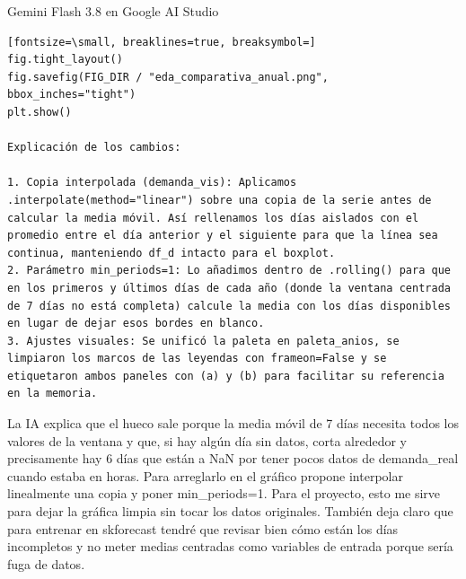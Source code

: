\documentclass[12pt,a4paper,oneside]{book}
\begin{document}
\begin{iaresp}{Gemini Flash 3.8 en Google AI Studio}
\begin{Verbatim}[fontsize=\small, breaklines=true, breaksymbol=]
fig.tight_layout()
fig.savefig(FIG_DIR / "eda_comparativa_anual.png", bbox_inches="tight")
plt.show()

Explicación de los cambios:

1. Copia interpolada (demanda_vis): Aplicamos .interpolate(method="linear") sobre una copia de la serie antes de calcular la media móvil. Así rellenamos los días aislados con el promedio entre el día anterior y el siguiente para que la línea sea continua, manteniendo df_d intacto para el boxplot.
2. Parámetro min_periods=1: Lo añadimos dentro de .rolling() para que en los primeros y últimos días de cada año (donde la ventana centrada de 7 días no está completa) calcule la media con los días disponibles en lugar de dejar esos bordes en blanco.
3. Ajustes visuales: Se unificó la paleta en paleta_anios, se limpiaron los marcos de las leyendas con frameon=False y se etiquetaron ambos paneles con (a) y (b) para facilitar su referencia en la memoria.
\end{Verbatim}
\end{iaresp}
\begin{iaanalisis}
La IA explica que el hueco sale porque la media móvil de 7 días necesita todos los valores de la ventana y que, si hay algún día sin datos, corta alrededor y precisamente hay 6 días que están a NaN por tener pocos datos de demanda\_real cuando estaba en horas. Para arreglarlo en el gráfico propone interpolar linealmente una copia y poner min\_periods=1. Para el proyecto, esto me sirve para dejar la gráfica limpia sin tocar los datos originales. También deja claro que para entrenar en skforecast tendré que revisar bien cómo están los días incompletos y no meter medias centradas como variables de entrada porque sería fuga de datos.
\end{iaanalisis}
\end{document}
